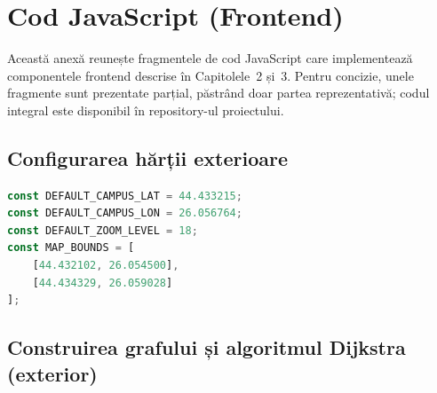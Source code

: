
\chapter{Cod JavaScript (Frontend)}
\label{anexa:js}

Această anexă reunește fragmentele de cod JavaScript care implementează
componentele frontend descrise în Capitolele~2 și~3. Pentru concizie, unele
fragmente sunt prezentate parțial, păstrând doar partea reprezentativă;
codul integral este disponibil în repository-ul proiectului.

\section*{Configurarea hărții exterioare}

\begin{lstlisting}[language=JavaScript, caption={Parametrii de configurare ai hartii campusului (extras din utils.js)}, label={lst:b1}]
const DEFAULT_CAMPUS_LAT = 44.433215;
const DEFAULT_CAMPUS_LON = 26.056764;
const DEFAULT_ZOOM_LEVEL = 18;
const MAP_BOUNDS = [
    [44.432102, 26.054500], 
    [44.434329, 26.059028]  
];
\end{lstlisting}

\section*{Construirea grafului și algoritmul Dijkstra (exterior)}

